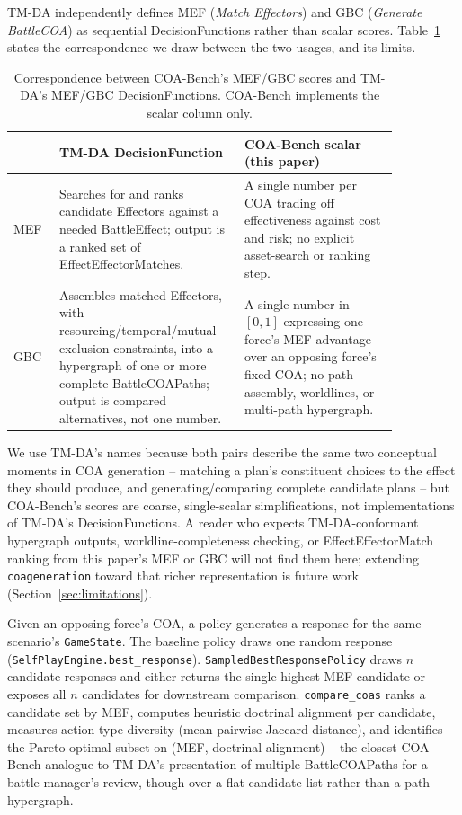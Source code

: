\documentclass[letterpaper]{article} %
\begin{document}
TM-DA \citep{tmda2025bootcamp} independently defines MEF (\emph{Match Effectors}) and GBC (\emph{Generate BattleCOA}) as sequential DecisionFunctions rather than scalar scores. Table~\ref{tab:correspondence} states the correspondence we draw between the two usages, and its limits.

\begin{table}[t]
\centering
\small
\caption{Correspondence between COA-Bench's MEF/GBC scores and TM-DA's MEF/GBC DecisionFunctions. COA-Bench implements the scalar column only.}
\label{tab:correspondence}
\begin{tabular}{p{0.11\linewidth}p{0.37\linewidth}p{0.37\linewidth}}
\toprule
 & TM-DA DecisionFunction & COA-Bench scalar (this paper) \\
\midrule
MEF & Searches for and ranks candidate Effectors against a needed BattleEffect; output is a ranked set of EffectEffectorMatches. & A single number per COA trading off effectiveness against cost and risk; no explicit asset-search or ranking step. \\
\addlinespace
GBC & Assembles matched Effectors, with resourcing/temporal/mutual-exclusion constraints, into a hypergraph of one or more complete BattleCOAPaths; output is compared alternatives, not one number. & A single number in $[0,1]$ expressing one force's MEF advantage over an opposing force's fixed COA; no path assembly, worldlines, or multi-path hypergraph. \\
\bottomrule
\end{tabular}
\end{table}

We use TM-DA's names because both pairs describe the same two conceptual moments in COA generation -- matching a plan's constituent choices to the effect they should produce, and generating/comparing complete candidate plans -- but COA-Bench's scores are coarse, single-scalar simplifications, not implementations of TM-DA's DecisionFunctions. A reader who expects TM-DA-conformant hypergraph outputs, worldline-completeness checking, or EffectEffectorMatch ranking from this paper's MEF or GBC will not find them here; extending \texttt{coageneration} toward that richer representation is future work (Section~\ref{sec:limitations}).

Given an opposing force's COA, a policy generates a response for the same scenario's \texttt{GameState}. The baseline policy draws one random response (\texttt{SelfPlayEngine.best\_response}). \texttt{SampledBestResponsePolicy} draws $n$ candidate responses and either returns the single highest-MEF candidate or exposes all $n$ candidates for downstream comparison. \texttt{compare\_coas} ranks a candidate set by MEF, computes heuristic doctrinal alignment per candidate, measures action-type diversity (mean pairwise Jaccard distance), and identifies the Pareto-optimal subset on (MEF, doctrinal alignment) -- the closest COA-Bench analogue to TM-DA's presentation of multiple BattleCOAPaths for a battle manager's review, though over a flat candidate list rather than a path hypergraph.
\end{document}

